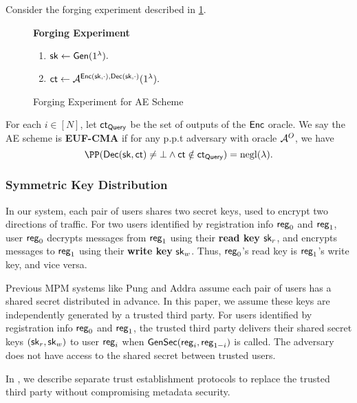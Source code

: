 \begin{definition}
\label{defn:AE-unforgability}
Consider the forging experiment described in \cref{expr:AE-forging}.

\begin{figure}[h!]
\begin{framed}
\textbf{Forging Experiment}
\begin{enumerate}
    \item ${\mathsf{sk}} \leftarrow \mathsf{Gen}(1^{\lambda}).$
    \item $\mathsf{ct} \leftarrow \mathcal{A}^{\mathsf{Enc}({\mathsf{sk}}, \cdot), \mathsf{Dec}({\mathsf{sk}}, \cdot)}(1^{\lambda}).$
\end{enumerate}
\end{framed}
\caption{Forging Experiment for AE Scheme}
\label{expr:AE-forging}
\end{figure}

For each $i \in [N]$, let $\mathsf{ct}_{\mathsf{Query}}$ be the set of outputs of the $\mathsf{Enc}$ oracle. We say the AE scheme is \textbf{EUF-CMA} if for any p.p.t adversary with oracle $\mathcal{A}^O$, we have
$$\PP(\dec(\sk, \ct) \neq \bot \land \ct \notin \ct_{\query}) = \negl(\lambda).$$
\end{definition}

\subsubsection{Symmetric Key Distribution}
In our system, each pair of users shares two secret keys, used to encrypt two directions of traffic. For two users identified by registration info $\mathsf{reg}_0$ and $\mathsf{reg}_1$, user $\mathsf{reg}_0$ decrypts messages from $\mathsf{reg}_1$ using their \textbf{read key} ${\mathsf{sk}}_r$, and encrypts messages to $\mathsf{reg}_1$ using their \textbf{write key} ${\mathsf{sk}}_w$. Thus, $\mathsf{reg}_0$'s read key is $\mathsf{reg}_1$'s write key, and vice versa.

Previous MPM systems like Pung and Addra assume each pair of users has a shared secret distributed in advance.  In this paper, we assume these keys are independently generated by a trusted third party.  For users identified by registration info $\mathsf{reg}_0$ and $\mathsf{reg}_1$, the trusted third party delivers their shared secret keys $({\mathsf{sk}}_r, {\mathsf{sk}}_w)$ to user $\mathsf{reg}_i$ when $\mathsf{GenSec}(\mathsf{reg}_i, \mathsf{reg}_{1 - i})$ is called. The adversary does not have access to the shared secret between trusted users.

In \cite[Section 4]{whitepaper}, we describe separate trust establishment protocols to replace the trusted third party without compromising metadata security. 
